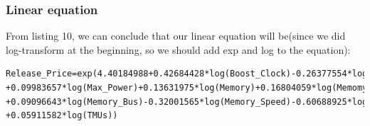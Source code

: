 \documentclass[a4paper]{article}
\theoremstyle{definition}
\begin{document}
\subsubsection{Linear equation}

From listing 10, we can conclude that our linear equation will be(since we did log-transform at the beginning, so we should add exp and log to the equation):
\begin{mdframed}[leftline=false,rightline=false,backgroundcolor=lightblue!10,nobreak=false,numbers=false]
    \begin{verbatim}
Release_Price=exp(4.40184988+0.42684428*log(Boost_Clock)-0.26377554*log(Core_Speed)
+0.09983657*log(Max_Power)+0.13631975*log(Memory)+0.16804059*log(Memomy_Bandwidth)
+0.09096643*log(Memory_Bus)-0.32001565*log(Memory_Speed)-0.60688925*log(Shader)
+0.05911582*log(TMUs))
\end{verbatim}
\end{mdframed}
\end{document}
